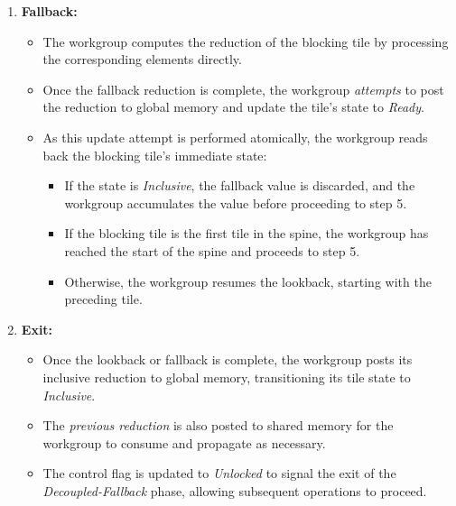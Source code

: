 \documentclass[sigconf]{acmart}
\begin{document}
\begin{enumerate}
  \item \textbf{Fallback:}
  \begin{itemize}
      \item The workgroup computes the reduction of the blocking tile by processing the corresponding elements directly.
      \item Once the fallback reduction is complete, the workgroup \emph{attempts} to post the reduction to global memory and update the tile's state to \emph{Ready}.
      \item As this update attempt is performed atomically, the workgroup reads back the blocking tile's immediate state:
      \begin{itemize}
          \item If the state is \emph{Inclusive}, the fallback value is discarded, and the workgroup accumulates the value before proceeding to step 5.
          \item If the blocking tile is the first tile in the spine, the workgroup has reached the start of the spine and proceeds to step 5.
          \item Otherwise, the workgroup resumes the lookback, starting with the preceding tile.
      \end{itemize}
  \end{itemize}

  \item \textbf{Exit:}
  \begin{itemize}
      \item Once the lookback or fallback is complete, the workgroup posts its inclusive reduction to global memory, transitioning its tile state to \emph{Inclusive}.
      \item The \emph{previous reduction} is also posted to shared memory for the workgroup to consume and propagate as necessary.
      \item The control flag is updated to \emph{Unlocked} to signal the exit of the \emph{Decoupled-Fallback} phase, allowing subsequent operations to proceed.
  \end{itemize}
\end{enumerate}
\end{document}
